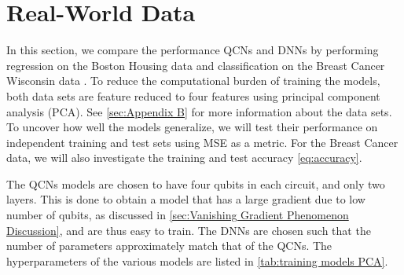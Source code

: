 \section{Real-World Data}\label{sec:Real Data}
In this section, we compare the performance QCNs and DNNs by performing regression on the Boston Housing data \cite{boston} and classification on the Breast Cancer Wisconsin data \cite{cancer}. To reduce the computational burden of training the models, both data sets are feature reduced to four features using principal component analysis (PCA). See \autoref{sec:Appendix B} for more information about the data sets. To uncover how well the models generalize, we will test their performance on independent training and test sets using MSE as a metric. For the Breast Cancer data, we will also investigate the training and test accuracy \autoref{eq:accuracy}. 

The QCNs models are chosen to have four qubits in each circuit, and only two layers. This is done to obtain a model that has a large gradient due to low number of qubits, as discussed in \autoref{sec:Vanishing Gradient Phenomenon Discussion}, and are thus easy to train. The DNNs are chosen such that the number of parameters approximately match that of the QCNs. The hyperparameters of the various models are listed in \autoref{tab:training models PCA}.





